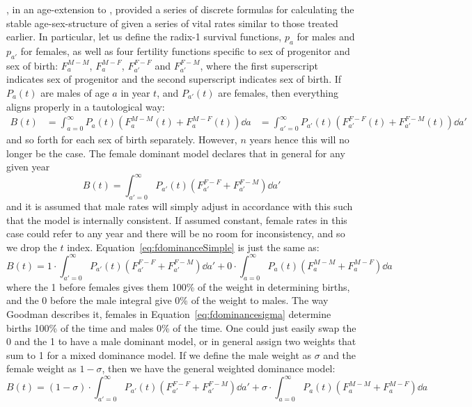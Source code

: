 \FloatBarrier
\label{sec:googmanage}
\citet{goodman1967age}, in an age-extension to \citet{goodman1953population},
provided a series of discrete formulas for calculating the
stable age-sex-structure of given a series of vital rates similar to those
treated earlier. In particular, let us define the radix-1 survival functions,
$p_a$ for males and $p_{a'}$ for females, as well as four fertility
functions specific to sex of progenitor and sex of birth:
$F_a^{M-M}$, $F_a^{M-F}$, $F_{a'}^{F-F}$ and  $F_{a'}^{F-M}$, where the first
superscript indicates sex of progenitor and the second superscript indicates sex
of birth. If $P_a(t)$ are males of age $a$ in year $t$, and $P_{a'}(t)$ are
females, then everything aligns properly in a tautological way:
\begin{align}
B(t) &= \int_{a=0}^\infty P_a(t) (F_a^{M-M}(t)+F_a^{M-F}(t)) \dd a
     &= \int_{a'=0}^\infty P_{a'}(t) (F_{a'}^{F-F}(t)+F_{a'}^{F-M}(t)) \dd a'
\end{align}
and so forth for each sex of birth separately. However, $n$ years hence this
will no longer be the case. The female dominant model declares that in general
for any given year
\begin{equation}
\label{eq:fdominanceSimple}
B(t) = \int_{a'=0}^\infty P_{a'}(t) (F_{a'}^{F-F}+F_{a'}^{F-M}) \dd a'
\end{equation}
and it is assumed that male rates will simply adjust in accordance with this
such that the model is internally consistent. If assumed constant, female rates
in this case could refer to any year and there will be no room for
inconsistency, and so we drop the $t$ index.
Equation~\eqref{eq:fdominanceSimple} is just the same as:
\begin{equation}
\label{eq:fdominancesigma}
B(t) = 1 \cdot \int_{a'=0}^\infty P_{a'}(t) (F_{a'}^{F-F}+F_{a'}^{F-M}) \dd a' +
       0 \cdot \int_{a=0}^\infty P_a(t) (F_a^{M-M}+F_a^{M-F}) \dd a
\end{equation}
where the 1 before females gives them 100\% of the weight in determining births,
and the 0 before the male integral give 0\% of the weight to males. The way
Goodman describes it, females in Equation~\ref{eq:fdominancesigma} determine
births 100\% of the time and males 0\% of the time. One could just easily
swap the 0 and the 1 to have a male dominant model, or in general assign two
weights that sum to 1 for a mixed dominance model. If we define the male weight
as $\sigma$ and the female weight as $1-\sigma$, then we have the general
weighted dominance model:
\begin{equation}
\label{eq:dominancesigma}
B(t) = (1-\sigma) \cdot \int_{a'=0}^\infty P_{a'}(t) (F_{a'}^{F-F}+F_{a'}^{F-M})
\dd a' + \sigma \cdot \int_{a=0}^\infty P_a(t) (F_a^{M-M}+F_a^{M-F}) \dd a
\end{equation}
